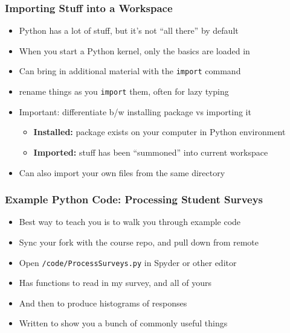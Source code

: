 \documentclass[aspectratio=169, handout]{beamer}
\begin{document}
\begin{frame}
\frametitle{Importing Stuff into a Workspace}
\begin{itemize}
	\item Python has a lot of stuff, but it's not ``all there'' by default
	
	\item When you start a Python kernel, only the basics are loaded in
	
	\item <2->Can bring in additional material with the \texttt{import} command
	
	\item <2-> rename things as you \texttt{import} them, often for lazy typing
	
	\item <3->Important: differentiate b/w installing package vs importing it
	\begin{itemize}
		\item <3->\textbf{Installed:} package exists on your computer in Python environment
		
		\item <3->\textbf{Imported:} stuff has been ``summoned'' into current workspace
	\end{itemize}

	\item <4->Can also import your own files from the same directory
\end{itemize}
\end{frame}


\begin{frame}
\frametitle{Example Python Code: Processing Student Surveys}
\begin{itemize}
	\item Best way to teach you is to walk you through example code
	
	\item Sync your fork with the course repo, and pull down from remote
	
	\item Open \texttt{/code/ProcessSurveys.py} in Spyder or other editor
	
	\item <2->Has functions to read in my survey, and all of yours
	
	\item <2->And then to produce histograms of responses
	
	\item <3->Written to show you a bunch of commonly useful things
\end{itemize}
\end{frame}
\end{document}
